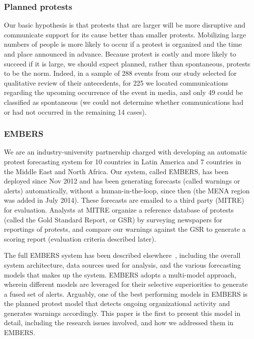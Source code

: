 \subsubsection{Planned protests}
Our basic hypothesis is that
protests that are larger will be more disruptive and communicate support for its cause better than smaller protests. 
Mobilizing large numbers of people is more likely to occur if a protest is organized and the time and place announced in
advance. Because protest is costly and more likely to succeed if it is large, we should expect planned, rather than 
spontaneous, protests to be the norm. Indeed, in a sample of 288 events from our study selected for qualitative review of their antecedents,
for 225 we located communications regarding the upcoming occurrence of the event in media, and only 49 could be classified as 
spontaneous (we could not determine whether communications had or had not occurred in the remaining 14 cases).

\subsubsection{EMBERS}
We are an industry-university partnership charged with developing an
automatic protest forecasting system for 10 countries in
Latin America and {\color{red} 7 countries in the Middle East and North
Africa}. Our system, called EMBERS, has been
deployed since Nov 2012 and has been generating forecasts (called
warnings or alerts) automatically, without a human-in-the-loop, since then (the MENA region was added in July 2014). These forecasts are emailed to
a third party (MITRE) for evaluation. Analysts at MITRE organize a reference
database of protests (called the Gold Standard Report,
or GSR) by surveying newspapers for reportings of protests, and
compare our warnings against the GSR to generate a scoring report (evaluation
criteria described later).

The full EMBERS system has been described elsewhere~\cite{emberskdd,DBLP:conf/bigdataconf/DoyleKSAZLMZLBKFR14}, including
the overall system architecture, data sources used for analysis, and the
various forecasting models that makes up the system. EMBERS adopts a multi-model approach,
wherein different models are leveraged for their selective superiorities
to generate a fused set of alerts. Arguably, one of the
best performing models in EMBERS is the planned protest model that detects
ongoing organizational activity and generates warnings accordingly. This paper
is the first to present this model in detail, including the 
research issues involved, and how we addressed them in EMBERS.

